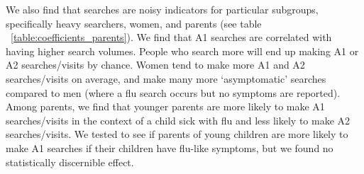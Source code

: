 \documentclass[12pt]{article}
\begin{document}
We also find that searches are noisy indicators for particular subgroups, specifically heavy searchers, women, and parents (see table ~\ref{table:coefficients_parents}). We find that A1 searches are correlated with having higher search volumes. People who search more will end up making A1 or A2 searches/visits by chance. Women tend to make more A1 and A2 searches/visits on average, and make many more `asymptomatic' searches compared to men (where a flu search occurs but no symptoms are reported). Among parents, we find that younger parents are more likely to make A1 searches/visits in the context of a child sick with flu and less likely to make A2 searches/visits. We tested to see if parents of young children are more likely to make A1 searches if their children have flu-like symptoms, but we found no statistically discernible effect.%
\end{document}
